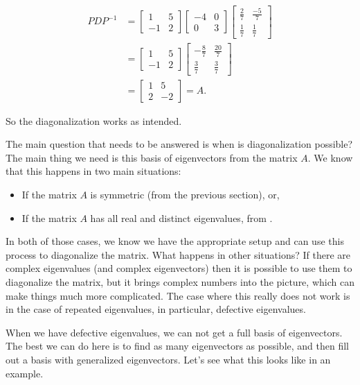 \begin{exampleSol}
\[
\begin{split}
PDP^{-1} &= \begin{bmatrix} 1 & 5 \\ -1 & 2 \end{bmatrix}\begin{bmatrix} -4 & 0 \\ 0 & 3 \end{bmatrix}\begin{bmatrix} \frac{2}{7} & \frac{-5}{7} \\ \frac{1}{7} & \frac{1}{7}\end{bmatrix} \\
&= \begin{bmatrix} 1 & 5 \\ -1 & 2 \end{bmatrix} \begin{bmatrix} -\frac{8}{7} & \frac{20}{7} \\ \frac{3}{7} & \frac{3}{7} \end{bmatrix} \\
&= \begin{bmatrix} 1 & 5 \\ 2 & -2 \end{bmatrix} = A.
\end{split}
\]

So the diagonalization works as intended.
\end{exampleSol}

The main question that needs to be answered is when is diagonalization possible? The main thing we need is this basis of eigenvectors from the matrix $A$. We know that this happens in two main situations:
\begin{itemize}
\item If the matrix $A$ is symmetric (from the previous section), or,
\item If the matrix $A$ has all real and distinct eigenvalues, from .
\end{itemize}

In both of those cases, we know we have the appropriate setup and can use this process to diagonalize the matrix. What happens in other situations? If there are complex eigenvalues (and complex eigenvectors) then it is possible to use them to diagonalize the matrix, but it brings complex numbers into the picture, which can make things much more complicated. The case where this really does not work is in the case of repeated eigenvalues, in particular, defective eigenvalues. 

When we have defective eigenvalues, we can not get a full basis of eigenvectors. The best we can do here is to find as many eigenvectors as possible, and then fill out a basis with generalized eigenvectors. Let's see what this looks like in an example.

